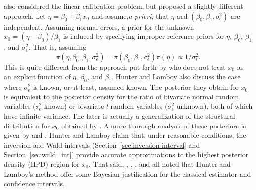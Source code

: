 \documentclass[cmfont,usenames,dvipsnames,leqno]{afit-etd}\usepackage[]{graphicx}\usepackage[]{color}
\begin{document}
\citet{hunter_bayesian_1981} also considered the linear calibration problem, but proposed a slightly different approach. Let $\eta = \beta_0 + \beta_1 x_0$ and assume,\textit{a priori}, that $\eta$ and $(\beta_0, \beta_1, \sigma_\epsilon^2)$ are independent. Assuming normal errors, a prior for the unknown $x_0 = (\eta - \beta_0)/\beta_1$ is induced by specifying improper reference priors for $\eta$, $\beta_0$, $\beta_1$, and $\sigma_\epsilon^2$. That is, assuming 
\begin{equation*}
  \pi\left(\eta, \beta_0, \beta_1, \sigma_\epsilon^2\right) = \pi\left(\beta_0, \beta_1, \sigma_\epsilon^2\right) \pi\left(\eta\right) \propto 1/\sigma_\epsilon^2. 
\end{equation*}
This is quite different from the approach put forth by \citet{hoadley_bayesian_1970} who does not treat $x_0$ as an explicit function of $\eta$, $\beta_0$, and $\beta_1$. Hunter and Lamboy also discuss the case where $\sigma_\epsilon^2$ is known, or at least, assumed known. The posterior they obtain for $x_0$ is equivalent to the posterior density for the ratio of bivariate normal random variables ($\sigma_\epsilon^2$ known) or bivariate $t$ random variables ($\sigma_\epsilon^2$ unknown), both of which have infinite variance. The later is actually a generalization of the structural distribution for $x_0$ obtained by \citet{kalotay_structural_1971}. A more thorough analysis of these posteriors is given by \citet{hunter_bayesian_1979} and \citet{hunter_making_1979}. Hunter and Lamboy claim that, under reasonable conditions, the inversion and Wald intervals (Section~\ref{sec:inversion-interval} and Section~\ref{sec:wald_int}) provide accurate approximations to the highest posterior density (HPD) region for $x_0$. That said, \citet{hill_discussion_1981}, \citet{orban_discussion_1981}, \citet{lwin_discussion_1981}, and \citet{brown_multivariate_1982} all noted that Hunter and Lamboy's method offer some Bayesian justification for the classical estimator and confidence intervals. 
\end{document}
